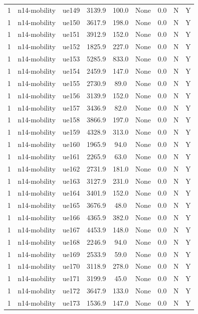 \begin{table}[ht]
\begin{tabular}{|c|c|c|c|c|c|c|c|c|}
1 & n14-mobility & ue149 & 3139.9 & 100.0 & None & 0.0 & N & Y \\
1 & n14-mobility & ue150 & 3617.9 & 198.0 & None & 0.0 & N & Y \\
1 & n14-mobility & ue151 & 3912.9 & 152.0 & None & 0.0 & N & Y \\
1 & n14-mobility & ue152 & 1825.9 & 227.0 & None & 0.0 & N & Y \\
1 & n14-mobility & ue153 & 5285.9 & 833.0 & None & 0.0 & N & Y \\
1 & n14-mobility & ue154 & 2459.9 & 147.0 & None & 0.0 & N & Y \\
1 & n14-mobility & ue155 & 2730.9 & 89.0 & None & 0.0 & N & Y \\
1 & n14-mobility & ue156 & 3139.9 & 152.0 & None & 0.0 & N & Y \\
1 & n14-mobility & ue157 & 3436.9 & 82.0 & None & 0.0 & N & Y \\
1 & n14-mobility & ue158 & 3866.9 & 197.0 & None & 0.0 & N & Y \\
1 & n14-mobility & ue159 & 4328.9 & 313.0 & None & 0.0 & N & Y \\
1 & n14-mobility & ue160 & 1965.9 & 94.0 & None & 0.0 & N & Y \\
1 & n14-mobility & ue161 & 2265.9 & 63.0 & None & 0.0 & N & Y \\
1 & n14-mobility & ue162 & 2731.9 & 181.0 & None & 0.0 & N & Y \\
1 & n14-mobility & ue163 & 3127.9 & 231.0 & None & 0.0 & N & Y \\
1 & n14-mobility & ue164 & 3401.9 & 152.0 & None & 0.0 & N & Y \\
1 & n14-mobility & ue165 & 3676.9 & 48.0 & None & 0.0 & N & Y \\
1 & n14-mobility & ue166 & 4365.9 & 382.0 & None & 0.0 & N & Y \\
1 & n14-mobility & ue167 & 4453.9 & 148.0 & None & 0.0 & N & Y \\
1 & n14-mobility & ue168 & 2246.9 & 94.0 & None & 0.0 & N & Y \\
1 & n14-mobility & ue169 & 2533.9 & 59.0 & None & 0.0 & N & Y \\
1 & n14-mobility & ue170 & 3118.9 & 278.0 & None & 0.0 & N & Y \\
1 & n14-mobility & ue171 & 3199.9 & 45.0 & None & 0.0 & N & Y \\
1 & n14-mobility & ue172 & 3647.9 & 133.0 & None & 0.0 & N & Y \\
1 & n14-mobility & ue173 & 1536.9 & 147.0 & None & 0.0 & N & Y \\

\end{tabular}
\end{table}

